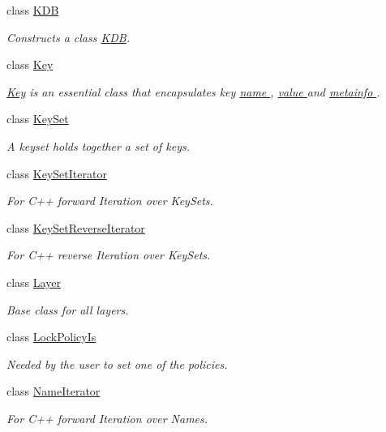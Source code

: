 \begin{DoxyCompactItemize}
class \hyperlink{classkdb_1_1KDB}{K\+D\+B}
\begin{DoxyCompactList}\small\item\em Constructs a class \hyperlink{classkdb_1_1KDB}{K\+D\+B}. \end{DoxyCompactList}\item 
class \hyperlink{classkdb_1_1Key}{Key}
\begin{DoxyCompactList}\small\item\em \hyperlink{classkdb_1_1Key}{Key} is an essential class that encapsulates key \hyperlink{group__keyname}{name }, \hyperlink{group__keyvalue}{value } and \hyperlink{group__keymeta}{metainfo }. \end{DoxyCompactList}\item 
class \hyperlink{classkdb_1_1KeySet}{Key\+Set}
\begin{DoxyCompactList}\small\item\em A keyset holds together a set of keys. \end{DoxyCompactList}\item 
class \hyperlink{classkdb_1_1KeySetIterator}{Key\+Set\+Iterator}
\begin{DoxyCompactList}\small\item\em For C++ forward Iteration over Key\+Sets. \end{DoxyCompactList}\item 
class \hyperlink{classkdb_1_1KeySetReverseIterator}{Key\+Set\+Reverse\+Iterator}
\begin{DoxyCompactList}\small\item\em For C++ reverse Iteration over Key\+Sets. \end{DoxyCompactList}\item 
class \hyperlink{classkdb_1_1Layer}{Layer}
\begin{DoxyCompactList}\small\item\em Base class for all layers. \end{DoxyCompactList}\item 
class \hyperlink{classkdb_1_1LockPolicyIs}{Lock\+Policy\+Is}
\begin{DoxyCompactList}\small\item\em Needed by the user to set one of the policies. \end{DoxyCompactList}\item 
class \hyperlink{classkdb_1_1NameIterator}{Name\+Iterator}
\begin{DoxyCompactList}\small\item\em For C++ forward Iteration over Names. \end{DoxyCompactList}\item 

\end{DoxyCompactItemize}
